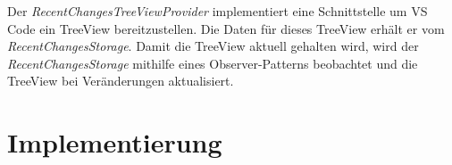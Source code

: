 Der \emph{RecentChangesTreeViewProvider} implementiert eine Schnittstelle
um VS Code ein TreeView bereitzustellen. Die Daten für dieses TreeView
erhält er vom \emph{RecentChangesStorage}. Damit die TreeView aktuell
gehalten wird, wird der \emph{RecentChangesStorage} mithilfe eines Observer-Patterns %
beobachtet und die TreeView bei Veränderungen aktualisiert.



\section{Implementierung}
\label{sec:EntwicklungVsCode_Implementierung}

